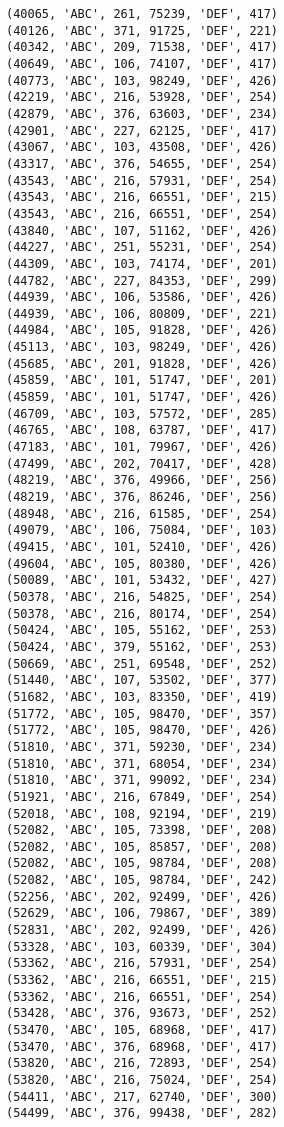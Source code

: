 \begin{verbatim}
(40065, 'ABC', 261, 75239, 'DEF', 417)
(40126, 'ABC', 371, 91725, 'DEF', 221)
(40342, 'ABC', 209, 71538, 'DEF', 417)
(40649, 'ABC', 106, 74107, 'DEF', 417)
(40773, 'ABC', 103, 98249, 'DEF', 426)
(42219, 'ABC', 216, 53928, 'DEF', 254)
(42879, 'ABC', 376, 63603, 'DEF', 234)
(42901, 'ABC', 227, 62125, 'DEF', 417)
(43067, 'ABC', 103, 43508, 'DEF', 426)
(43317, 'ABC', 376, 54655, 'DEF', 254)
(43543, 'ABC', 216, 57931, 'DEF', 254)
(43543, 'ABC', 216, 66551, 'DEF', 215)
(43543, 'ABC', 216, 66551, 'DEF', 254)
(43840, 'ABC', 107, 51162, 'DEF', 426)
(44227, 'ABC', 251, 55231, 'DEF', 254)
(44309, 'ABC', 103, 74174, 'DEF', 201)
(44782, 'ABC', 227, 84353, 'DEF', 299)
(44939, 'ABC', 106, 53586, 'DEF', 426)
(44939, 'ABC', 106, 80809, 'DEF', 221)
(44984, 'ABC', 105, 91828, 'DEF', 426)
(45113, 'ABC', 103, 98249, 'DEF', 426)
(45685, 'ABC', 201, 91828, 'DEF', 426)
(45859, 'ABC', 101, 51747, 'DEF', 201)
(45859, 'ABC', 101, 51747, 'DEF', 426)
(46709, 'ABC', 103, 57572, 'DEF', 285)
(46765, 'ABC', 108, 63787, 'DEF', 417)
(47183, 'ABC', 101, 79967, 'DEF', 426)
(47499, 'ABC', 202, 70417, 'DEF', 428)
(48219, 'ABC', 376, 49966, 'DEF', 256)
(48219, 'ABC', 376, 86246, 'DEF', 256)
(48948, 'ABC', 216, 61585, 'DEF', 254)
(49079, 'ABC', 106, 75084, 'DEF', 103)
(49415, 'ABC', 101, 52410, 'DEF', 426)
(49604, 'ABC', 105, 80380, 'DEF', 426)
(50089, 'ABC', 101, 53432, 'DEF', 427)
(50378, 'ABC', 216, 54825, 'DEF', 254)
(50378, 'ABC', 216, 80174, 'DEF', 254)
(50424, 'ABC', 105, 55162, 'DEF', 253)
(50424, 'ABC', 379, 55162, 'DEF', 253)
(50669, 'ABC', 251, 69548, 'DEF', 252)
(51440, 'ABC', 107, 53502, 'DEF', 377)
(51682, 'ABC', 103, 83350, 'DEF', 419)
(51772, 'ABC', 105, 98470, 'DEF', 357)
(51772, 'ABC', 105, 98470, 'DEF', 426)
(51810, 'ABC', 371, 59230, 'DEF', 234)
(51810, 'ABC', 371, 68054, 'DEF', 234)
(51810, 'ABC', 371, 99092, 'DEF', 234)
(51921, 'ABC', 216, 67849, 'DEF', 254)
(52018, 'ABC', 108, 92194, 'DEF', 219)
(52082, 'ABC', 105, 73398, 'DEF', 208)
(52082, 'ABC', 105, 85857, 'DEF', 208)
(52082, 'ABC', 105, 98784, 'DEF', 208)
(52082, 'ABC', 105, 98784, 'DEF', 242)
(52256, 'ABC', 202, 92499, 'DEF', 426)
(52629, 'ABC', 106, 79867, 'DEF', 389)
(52831, 'ABC', 202, 92499, 'DEF', 426)
(53328, 'ABC', 103, 60339, 'DEF', 304)
(53362, 'ABC', 216, 57931, 'DEF', 254)
(53362, 'ABC', 216, 66551, 'DEF', 215)
(53362, 'ABC', 216, 66551, 'DEF', 254)
(53428, 'ABC', 376, 93673, 'DEF', 252)
(53470, 'ABC', 105, 68968, 'DEF', 417)
(53470, 'ABC', 376, 68968, 'DEF', 417)
(53820, 'ABC', 216, 72893, 'DEF', 254)
(53820, 'ABC', 216, 75024, 'DEF', 254)
(54411, 'ABC', 217, 62740, 'DEF', 300)
(54499, 'ABC', 376, 99438, 'DEF', 282)

\end{verbatim}
